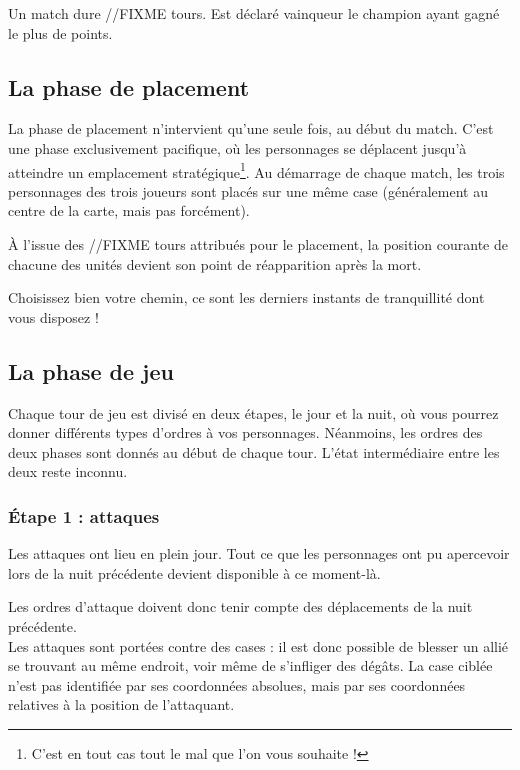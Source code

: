 Un match dure //FIXME tours. Est déclaré vainqueur le champion ayant
gagné le plus de points.

\subsection{La phase de placement}
La phase de placement n'intervient qu'une seule fois, au début du
match. C'est une phase exclusivement pacifique, où les personnages se
déplacent jusqu'à atteindre un emplacement stratégique\footnote{C'est
  en tout cas tout le mal que l'on vous souhaite !}.
Au démarrage de chaque match, les trois personnages des trois joueurs
sont placés sur une même case (généralement au centre de la carte,
mais pas forcément).

À l'issue des //FIXME tours attribués pour le placement, la position
courante de chacune des unités devient son point de réapparition après
la mort.

Choisissez bien votre chemin, ce sont les derniers instants de
tranquillité dont vous disposez !

\subsection{La phase de jeu}
Chaque tour de jeu est divisé en deux étapes, le jour et la nuit, où
vous pourrez donner différents types d'ordres à vos
personnages. Néanmoins, les ordres des deux phases sont donnés au
début de chaque tour. L'état intermédiaire entre les deux reste inconnu.

\subsubsection{Étape 1 : attaques}

Les attaques ont lieu en plein jour. Tout ce que les personnages ont
pu apercevoir lors de la nuit précédente devient disponible à ce moment-là.

Les ordres d'attaque doivent donc tenir compte des déplacements de la
nuit précédente.\\

Les attaques sont portées contre des cases : il est donc possible de
blesser un allié se trouvant au même endroit, voir même de s'infliger
des dégâts. La case ciblée n'est pas identifiée par ses coordonnées
absolues, mais par ses coordonnées relatives à la position de l'attaquant.\\

